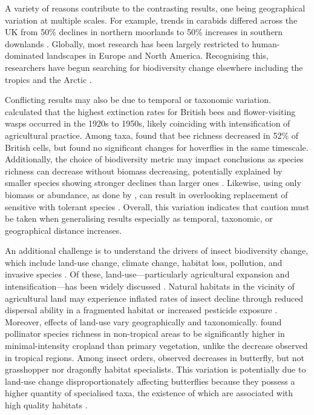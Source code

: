 \documentclass[11pt]{article}
\begin{document}
		\noindent A variety of reasons contribute to the contrasting results, one being geographical variation at multiple scales. For example, trends in carabids differed across the UK from 50\% declines in northern moorlands to 50\% increases in southern downlands \parencite{brooks2012large}. Globally, most research has been largely restricted to human-dominated landscapes in Europe and North America. Recognising this, researchers have begun searching for biodiversity change elsewhere including the tropics \parencite{lister2018climate,wagner2021insect} and the Arctic \parencite{loboda2018declining,gillespie2020status}.    
		
		\noindent Conflicting results may also be due to temporal or taxonomic variation. \textcite{ollerton2014extinctions} calculated that the highest extinction rates for British bees and flower-visiting wasps occurred in the 1920s to 1950s, likely coinciding with intensification of agricultural practice. Among taxa, \textcite{biesmeijer2006parallel} found that bee richness decreased in 52\% of British cells, but found no significant changes for hoverflies in the same timescale. Additionally, the choice of biodiversity metric may impact conclusions as species richness can decrease without biomass decreasing, potentially explained by smaller species showing stronger declines than larger ones \parencite{homburg2019have}. Likewise, using only biomass or abundance, as done by \textcite{van2020meta}, can result in overlooking replacement of sensitive with tolerant species \parencite{jahnig2021revisiting}. Overall, this variation indicates that caution must be taken when generalising results especially as temporal, taxonomic, or geographical distance increases.   
		
		\noindent An additional challenge is to understand the drivers of insect biodiversity change, which include land-use change, climate change, habitat loss, pollution, and invasive species \parencite{cardoso2020scientists}. Of these, land-use—particularly agricultural expansion and intensification—has been widely discussed \parencite{newbold2014global,newbold2016global,newbold2018widespread,seibold2019arthropod,gillespie2022landscape}. Natural habitats in the vicinity of agricultural land may experience inflated rates of insect decline through reduced dispersal ability in a fragmented habitat or increased pesticide exposure \parencite{seibold2019arthropod}. Moreover, effects of land-use vary geographically and taxonomically. \textcite{millard2021global} found pollinator species richness in non-tropical areas to be significantly higher in minimal-intensity cropland than primary vegetation, unlike the decrease observed in tropical regions. Among insect orders, \textcite{engelhardt2022consistent} observed decreases in butterfly, but not grasshopper nor dragonfly habitat specialists. This variation is potentially due to land-use change disproportionately affecting butterflies because they possess a higher quantity of specialised taxa, the existence of which are associated with high quality habitats \parencite{poniatowski2018patch}. 
		
\end{document}
